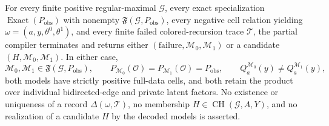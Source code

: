 For every finite positive regular-maximal \(\mathcal G\), every exact specialization \(\operatorname{Exact}(P_{\mathrm{obs}})\) with nonempty \(\mathfrak F(\mathcal G,P_{\mathrm{obs}})\), every negative cell relation yielding \(\omega=(a,y,\theta^0,\theta^1)\), and every finite failed colored-recursion trace \(\mathcal T\), the partial compiler terminates and returns either \((\mathrm{failure},\mathcal M_0,\mathcal M_1)\) or a candidate \((H,\mathcal M_0,\mathcal M_1)\). In either case,
\[
\mathcal M_0,\mathcal M_1\in\mathfrak F(\mathcal G,P_{\mathrm{obs}}),\qquad
P_{\mathcal M_0}(\mathcal O)=P_{\mathcal M_1}(\mathcal O)=P_{\mathrm{obs}},\qquad
Q_a^{\mathcal M_0}(y)\neq Q_a^{\mathcal M_1}(y),
\]
both models have strictly positive full-data cells, and both retain the product over individual bidirected-edge and private latent factors. No existence or uniqueness of a record \(\Delta(\omega,\mathcal T)\), no membership \(H\in\operatorname{CH}(\mathcal G,A,Y)\), and no realization of a candidate \(H\) by the decoded models is asserted.